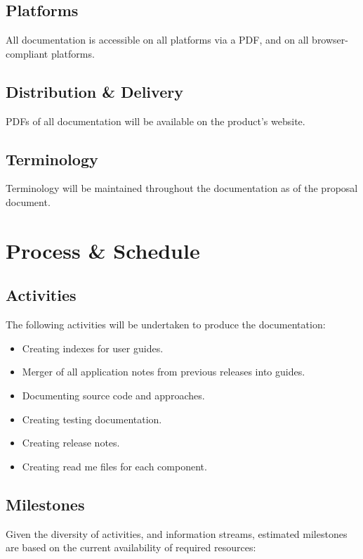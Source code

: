 \documentclass[12pt]{article}
\begin{document}
\subsection{Platforms}
All documentation is accessible on all platforms via a PDF, and on all browser-compliant platforms.

\subsection{Distribution \& Delivery}
PDFs of all documentation will be available on the product's website.

\subsection{Terminology}
Terminology will be maintained throughout the documentation as of the proposal document.

\section{Process \& Schedule}
\subsection{Activities}
The following activities will be undertaken to produce the documentation:
\begin{itemize}
	\item Creating indexes for user guides.
	\item Merger of all application notes from previous releases into guides.
	\item Documenting source code and approaches.
	\item Creating testing documentation.
	\item Creating release notes.
	\item Creating read me files for each component.
\end{itemize}

\subsection{Milestones}
Given the diversity of activities, and information streams, estimated milestones are based on the current availability of required resources:
\end{document}
